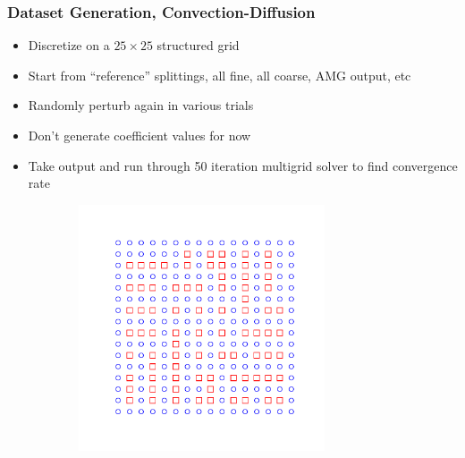 \documentclass[handout]{beamer}
\begin{document}
\begin{frame}
\begin{figure}[h]
\begin{subfigure}{.48\textwidth}
    \end{subfigure}
  \end{figure}
\end{frame}


\begin{frame}
  \frametitle{Dataset Generation, Convection-Diffusion}
  \begin{itemize}
  \item Discretize on a $25 \times 25$ structured grid
  \item Start from ``reference'' splittings, all fine, all coarse, AMG output, etc
  \item Randomly perturb again in various trials
  \item Don't generate coefficient values for now
  \item Take output and run through 50 iteration multigrid solver to find convergence rate
  \end{itemize}
  \begin{figure}[h]
  \begin{subfigure}{.48\textwidth}
    \includegraphics[width=0.8\textwidth]{figures/amgsplit.pdf}
  \end{subfigure}
  \begin{subfigure}{.48\textwidth}

\end{subfigure}
\end{figure}
\end{frame}
\end{document}
